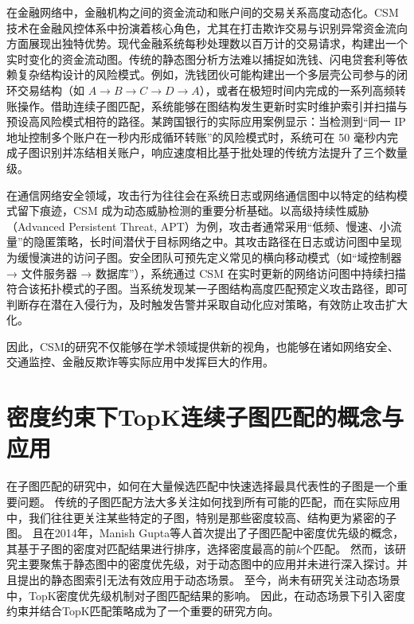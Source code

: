 在金融网络中，金融机构之间的资金流动和账户间的交易关系高度动态化\cite{csm-timing-DBLP:conf/icde/Li0O019}。CSM 技术在金融风控体系中扮演着核心角色，尤其在打击欺诈交易与识别异常资金流向方面展现出独特优势。现代金融系统每秒处理数以百万计的交易请求，构建出一个实时变化的资金流动图。传统的静态图分析方法难以捕捉如洗钱、闪电贷套利等依赖复杂结构设计的风险模式。例如，洗钱团伙可能构建出一个多层壳公司参与的闭环交易结构（如 $A \rightarrow B \rightarrow C \rightarrow D \rightarrow A$），或者在极短时间内完成的一系列高频转账操作。借助连续子图匹配，系统能够在图结构发生更新时实时维护索引并扫描与预设高风险模式相符的路径。某跨国银行的实际应用案例显示：当检测到“同一 IP 地址控制多个账户在一秒内形成循环转账”的风险模式时，系统可在 50 毫秒内完成子图识别并冻结相关账户，响应速度相比基于批处理的传统方法提升了三个数量级。

在通信网络安全领域，攻击行为往往会在系统日志或网络通信图中以特定的结构模式留下痕迹，CSM 成为动态威胁检测的重要分析基础\cite{static-topk-Gupta-DBLP:conf/icde/GuptaGYCH14}。以高级持续性威胁（Advanced Persistent Threat, APT）为例，攻击者通常采用“低频、慢速、小流量”的隐匿策略，长时间潜伏于目标网络之中。其攻击路径在日志或访问图中呈现为缓慢演进的访问子图。安全团队可预先定义常见的横向移动模式（如“域控制器 → 文件服务器 → 数据库”），系统通过 CSM 在实时更新的网络访问图中持续扫描符合该拓扑模式的子图。当系统发现某一子图结构高度匹配预定义攻击路径，即可判断存在潜在入侵行为，及时触发告警并采取自动化应对策略，有效防止攻击扩大化。

因此，CSM的研究不仅能够在学术领域提供新的视角，也能够在诸如网络安全、交通监控、金融反欺诈等实际应用中发挥巨大的作用。

\section{密度约束下TopK连续子图匹配的概念与应用}
在子图匹配的研究中，如何在大量候选匹配中快速选择最具代表性的子图是一个重要问题。
传统的子图匹配方法大多关注如何找到所有可能的匹配，而在实际应用中，我们往往更关注某些特定的子图，特别是那些密度较高、结构更为紧密的子图。
且在2014年，Manish Gupta等人首次提出了子图匹配中密度优先级的概念\cite{static-topk-Gupta-DBLP:conf/icde/GuptaGYCH14}，其基于子图的密度对匹配结果进行排序，选择密度最高的前$k$个匹配。
然而，该研究主要聚焦于静态图中的密度优先级，对于动态图中的应用并未进行深入探讨。并且提出的静态图索引无法有效应用于动态场景。
至今，尚未有研究关注动态场景中，TopK密度优先级机制对子图匹配结果的影响。
因此，在动态场景下引入密度约束并结合TopK匹配策略成为了一个重要的研究方向。

